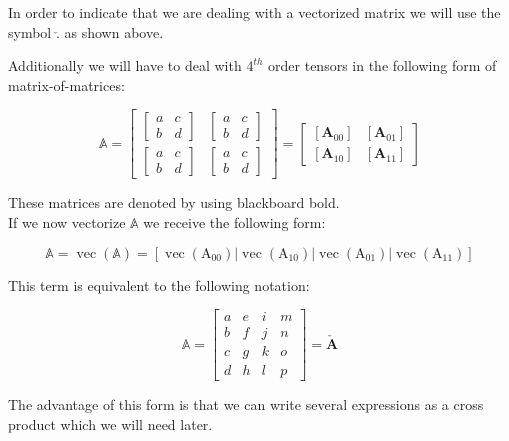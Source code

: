 In order to indicate that we are dealing with a vectorized matrix we will use the symbol $\check{.}$ as shown above.

Additionally we will have to deal with $4^{th}$ order tensors in the following form of matrix-of-matrices:

\[
\mathbb{A} = 
\left[\begin{array}{cc}{\begin{bmatrix} a & c \\ b & d \end{bmatrix}} & {\begin{bmatrix} a & c \\ b & d \end{bmatrix}} \\ {\begin{bmatrix} a & c \\ b & d \end{bmatrix}} & {\begin{bmatrix} a & c \\ b & d \end{bmatrix}}\end{array}\right]
=
\left[\begin{array}{cc}{\left[\mathbf{A}_{00}\right]} & {\left[\mathbf{A}_{01}\right]} \\ {\left[\mathbf{A}_{10}\right]} & {\left[\mathbf{A}_{11}\right]}\end{array}\right]
\]

These matrices are denoted by using blackboard bold.
\\
If we now vectorize $\mathbb{A}$ we receive the following form:

\[
\mathbb{A} = \operatorname{vec}(\mathbb{A})=\left[\operatorname{vec}\left(\mathrm{A}_{00}\right)\left|\operatorname{vec}\left(\mathrm{A}_{10}\right)\right| \operatorname{vec}\left(\mathrm{A}_{01}\right) | \operatorname{vec}\left(\mathrm{A}_{11}\right)\right]
\]

This term is equivalent to the following notation:

\[
\mathbb{A}=\left[\begin{array}{llll}{a} & {e} & {i} & {m} \\ {b} & {f} & {j} & {n} \\ {c} & {g} & {k} & {o} \\ {d} & {h} & {l} & {p}\end{array}\right] 
=\boldsymbol{\check{A}}
\]

The advantage of this form is that we can write several expressions as a cross product which we will need later.

